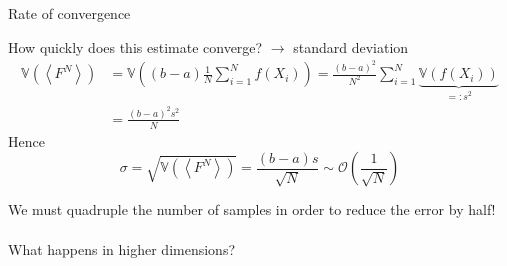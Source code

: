 \documentclass{beamer}
\begin{document}
\begin{frame}{Rate of convergence}

How quickly does this estimate converge? $\rightarrow$ standard deviation
\begin{equation*}
\begin{aligned}
\mathbb{V}(\left\langle
F^N
\right\rangle)
&=
\mathbb{V}\left(
(b-a) \frac{1}{N} \sum_{i=1}^{N} f(X_i)
\right)
=
\frac{(b-a)^2}{N^2} 
\sum_{i=1}^{N} 
\underbrace{\mathbb{V}\left(
f(X_i)
\right)}_{=: s^2}\\
&=
\frac{(b-a)^2 s^2}{N} 
\end{aligned}
\end{equation*}
Hence
$$
\sigma
=
\sqrt{\mathbb{V}(\left\langle
F^N
\right\rangle)} 
=
\frac{(b-a)s}{\sqrt{N} } 
\sim \mathcal{O}\left(\frac{1}{\sqrt{N}}\right)
$$
\begin{center}
We must quadruple the number of samples in order to reduce the error by half!\\
~\\
What happens in higher dimensions?
\end{center}
\end{frame}
\end{document}
